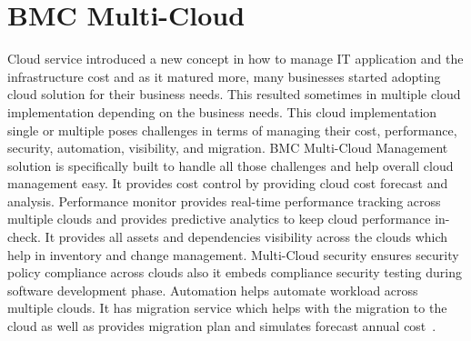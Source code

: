\section{BMC Multi-Cloud}
Cloud service introduced a new concept in how to manage IT application
and the infrastructure cost and as it matured more, many businesses
started adopting cloud solution for their business needs. This
resulted sometimes in multiple cloud implementation depending on the
business needs. This cloud implementation single or multiple poses
challenges in terms of managing their cost, performance, security,
automation, visibility, and migration. BMC Multi-Cloud Management
solution is specifically built to handle all those challenges and
help overall cloud management easy. It provides cost control by
providing cloud cost forecast and analysis. Performance monitor
provides real-time performance tracking across multiple clouds and
provides predictive analytics to keep cloud performance in-check. It
provides all assets and dependencies visibility across the clouds which help in
inventory and change management. Multi-Cloud security ensures security
policy compliance across clouds also it embeds compliance security testing
during software development phase. Automation helps automate workload across multiple
clouds. It has migration service which helps with the migration to the
cloud as well as provides migration plan and simulates forecast annual
cost~\cite{hid-sp18-402-bmc}.

